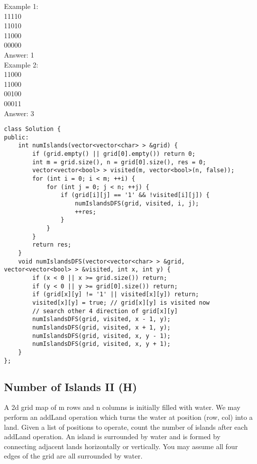 Example 1:\\
11110\\
11010\\
11000\\
00000\\
Answer: 1\\

Example 2:\\
11000\\
11000\\
00100\\
00011\\
Answer: 3\\

\begin{lstlisting}
class Solution {
public:
    int numIslands(vector<vector<char> > &grid) {
        if (grid.empty() || grid[0].empty()) return 0;
        int m = grid.size(), n = grid[0].size(), res = 0;
        vector<vector<bool> > visited(m, vector<bool>(n, false));
        for (int i = 0; i < m; ++i) {
            for (int j = 0; j < n; ++j) {
                if (grid[i][j] == '1' && !visited[i][j]) {
                    numIslandsDFS(grid, visited, i, j);
                    ++res;
                }
            }
        }
        return res;
    }
    void numIslandsDFS(vector<vector<char> > &grid, vector<vector<bool> > &visited, int x, int y) {
        if (x < 0 || x >= grid.size()) return;
        if (y < 0 || y >= grid[0].size()) return;
        if (grid[x][y] != '1' || visited[x][y]) return;
        visited[x][y] = true; // grid[x][y] is visited now
        // search other 4 direction of grid[x][y]
        numIslandsDFS(grid, visited, x - 1, y);
        numIslandsDFS(grid, visited, x + 1, y);
        numIslandsDFS(grid, visited, x, y - 1);
        numIslandsDFS(grid, visited, x, y + 1);
    }
};
\end{lstlisting}


\subsection{Number of Islands II (H)}
A 2d grid map of m rows and n columns is initially filled with water. We may perform an addLand operation which turns the water at position (row, col) into a land. Given a list of positions to operate, count the number of islands after each addLand operation. An island is surrounded by water and is formed by connecting adjacent lands horizontally or vertically. You may assume all four edges of the grid are all surrounded by water. \\

